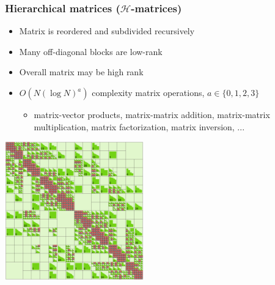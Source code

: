 \documentclass[10pt,final,xcolor=dvipsnames]{beamer}
\begin{document}
%
%
%
\begin{frame}
	\frametitle{Hierarchical matrices ($\mathcal{H}$-matrices)}
	\begin{itemize}
		\item Matrix is reordered and subdivided recursively
		\item Many off-diagonal blocks are low-rank
		\item Overall matrix may be high rank
		\item $O(N \left(\log N\right)^a)$ complexity matrix operations, $a \in \{0,1,2,3\}$
		\begin{itemize}
			\item matrix-vector products, matrix-matrix addition, matrix-matrix multiplication, matrix factorization, matrix inversion, ...
		\end{itemize}
	\end{itemize}
	\begin{center}
		\includegraphics[width=0.45\textwidth]{heat_inverse_problem_Hfull_hmatrix.eps}
	\end{center}
\end{frame}
\end{document}
